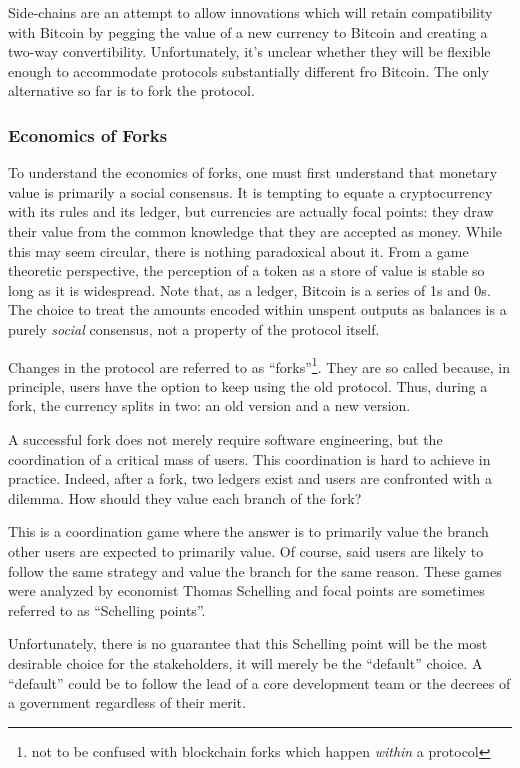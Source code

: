 \documentclass[letterpaper]{article}
\begin{document}
Side-chains are an attempt to allow innovations which will retain
compatibility with Bitcoin by pegging the value of a new currency to Bitcoin and
 creating a two-way convertibility. Unfortunately, it's unclear whether they
will be flexible enough to accommodate protocols substantially different fro
Bitcoin. The only alternative so far is to fork the protocol.

\subsubsection{Economics of Forks}

To understand the economics of forks, one must first understand that monetary
value is primarily a social consensus. It is tempting to equate a
cryptocurrency with its rules and its ledger, but currencies are actually focal
points: they draw their value from the common knowledge that they are accepted
as money. While this may seem circular, there is nothing paradoxical about it.
From a game theoretic perspective, the perception of a token as a store of value
is stable so long as it is widespread. Note that, as a ledger, Bitcoin is
a series of 1s and 0s. The choice to treat the amounts encoded within unspent
outputs as balances is a purely \emph{social} consensus, not a property of the
protocol itself.

Changes in the protocol are referred to as ``forks''\footnote{not to be confused
with blockchain forks which happen \emph{within} a protocol}. They are so called
because, in principle, users have the option to keep using the old protocol.
Thus, during a fork, the currency splits in two: an old version and a new
version.

A successful fork does not merely require software engineering, but
the coordination of a critical mass of users. This coordination is hard
to achieve in practice. Indeed, after a fork, two ledgers exist and users
are confronted with a dilemma. How should they value each branch of the fork?

This is a coordination game where the answer is to primarily value the branch
other users are expected to primarily value. Of course, said users are likely
to follow the same strategy and value the branch for the same reason. These
games were analyzed by economist Thomas Schelling and focal points are
sometimes referred to as ``Schelling points''\cite{schelling}.

Unfortunately, there is no guarantee that this Schelling point will be the most
desirable choice for the stakeholders, it will merely be the ``default'' choice.
A ``default'' could be to follow the lead of a core development team or the
decrees of a government regardless of their merit.
\end{document}
